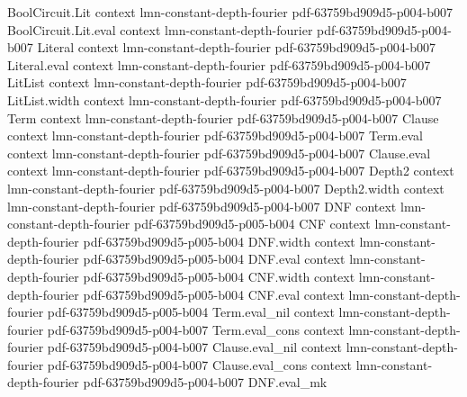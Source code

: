 \begin{lemma}
\leanok
{}
\proofstep
  {BoolCircuit.Lit}
  {context}
  {lmn-constant-depth-fourier}
  {pdf-63759bd909d5-p004-b007}
\proofstep
  {BoolCircuit.Lit.eval}
  {context}
  {lmn-constant-depth-fourier}
  {pdf-63759bd909d5-p004-b007}
\proofstep
  {Literal}
  {context}
  {lmn-constant-depth-fourier}
  {pdf-63759bd909d5-p004-b007}
\proofstep
  {Literal.eval}
  {context}
  {lmn-constant-depth-fourier}
  {pdf-63759bd909d5-p004-b007}
\proofstep
  {LitList}
  {context}
  {lmn-constant-depth-fourier}
  {pdf-63759bd909d5-p004-b007}
\proofstep
  {LitList.width}
  {context}
  {lmn-constant-depth-fourier}
  {pdf-63759bd909d5-p004-b007}
\proofstep
  {Term}
  {context}
  {lmn-constant-depth-fourier}
  {pdf-63759bd909d5-p004-b007}
\proofstep
  {Clause}
  {context}
  {lmn-constant-depth-fourier}
  {pdf-63759bd909d5-p004-b007}
\proofstep
  {Term.eval}
  {context}
  {lmn-constant-depth-fourier}
  {pdf-63759bd909d5-p004-b007}
\proofstep
  {Clause.eval}
  {context}
  {lmn-constant-depth-fourier}
  {pdf-63759bd909d5-p004-b007}
\proofstep
  {Depth2}
  {context}
  {lmn-constant-depth-fourier}
  {pdf-63759bd909d5-p004-b007}
\proofstep
  {Depth2.width}
  {context}
  {lmn-constant-depth-fourier}
  {pdf-63759bd909d5-p004-b007}
\proofstep
  {DNF}
  {context}
  {lmn-constant-depth-fourier}
  {pdf-63759bd909d5-p005-b004}
\proofstep
  {CNF}
  {context}
  {lmn-constant-depth-fourier}
  {pdf-63759bd909d5-p005-b004}
\proofstep
  {DNF.width}
  {context}
  {lmn-constant-depth-fourier}
  {pdf-63759bd909d5-p005-b004}
\proofstep
  {DNF.eval}
  {context}
  {lmn-constant-depth-fourier}
  {pdf-63759bd909d5-p005-b004}
\proofstep
  {CNF.width}
  {context}
  {lmn-constant-depth-fourier}
  {pdf-63759bd909d5-p005-b004}
\proofstep
  {CNF.eval}
  {context}
  {lmn-constant-depth-fourier}
  {pdf-63759bd909d5-p005-b004}
\proofstep
  {Term.eval_nil}
  {context}
  {lmn-constant-depth-fourier}
  {pdf-63759bd909d5-p004-b007}
\proofstep
  {Term.eval_cons}
  {context}
  {lmn-constant-depth-fourier}
  {pdf-63759bd909d5-p004-b007}
\proofstep
  {Clause.eval_nil}
  {context}
  {lmn-constant-depth-fourier}
  {pdf-63759bd909d5-p004-b007}
\proofstep
  {Clause.eval_cons}
  {context}
  {lmn-constant-depth-fourier}
  {pdf-63759bd909d5-p004-b007}
\proofstep
  {DNF.eval_mk}

\end{lemma}
